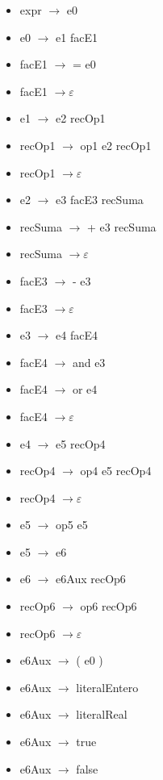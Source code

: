 \documentclass[11pt]{article}
\begin{document}
        \begin{itemize}
            \item expr $\rightarrow$ e0
            \item e0 $\rightarrow$ e1 facE1
            \item facE1 $\rightarrow$ = e0
            \item facE1 $\rightarrow \varepsilon$
            \item e1 $\rightarrow$ e2 recOp1
            \item recOp1 $\rightarrow$ op1 e2 recOp1
            \item recOp1 $\rightarrow \varepsilon$
            \item e2 $\rightarrow$ e3 facE3  recSuma 
            \item recSuma  $\rightarrow$ + e3 recSuma 
            \item recSuma  $\rightarrow \varepsilon$
            \item facE3  $\rightarrow$ - e3
            \item facE3  $\rightarrow \varepsilon$
            \item e3 $\rightarrow$ e4 facE4
            \item facE4 $\rightarrow$ and e3
            \item facE4 $\rightarrow$ or e4
            \item facE4 $\rightarrow \varepsilon$
            \item e4 $\rightarrow$ e5 recOp4
            \item recOp4 $\rightarrow$ op4 e5 recOp4
            \item recOp4 $\rightarrow \varepsilon$
            \item e5 $\rightarrow$ op5 e5
            \item e5 $\rightarrow$ e6
            \item e6 $\rightarrow$ e6Aux recOp6
            \item recOp6 $\rightarrow$ op6 recOp6
            \item recOp6 $\rightarrow \varepsilon$
            \item e6Aux  $\rightarrow$ ( e0 )
            \item e6Aux  $\rightarrow$ literalEntero
            \item e6Aux  $\rightarrow$ literalReal
            \item e6Aux  $\rightarrow$ true
            \item e6Aux  $\rightarrow$ false

\end{itemize}
\end{document}
